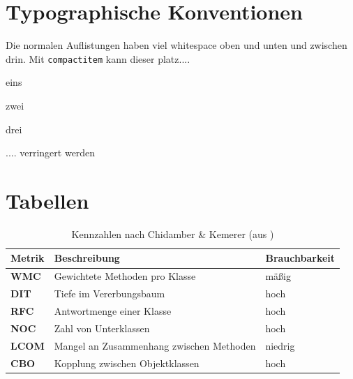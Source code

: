 \section{Typographische Konventionen}
Die normalen Auflistungen haben viel whitespace oben und unten und zwischen drin. Mit \texttt{compactitem} kann dieser platz....
\begin{compactitem}
\item eins
\item zwei
\item drei
\end{compactitem}
.... verringert werden

\section{Tabellen}
\blindtext
\begin{table}[h]
	\centering
	\begin{tabular}{|l|l|l|}
\hline 
		Metrik 		  &Beschreibung 								&  Brauchbarkeit\\ 
\hline  
		\textbf{WMC}  &Gewichtete Methoden pro Klasse 				&  mäßig 		\\ 
\hline  
		\textbf{DIT}  &Tiefe im Vererbungsbaum 						&  hoch 		\\ 
\hline  
		\textbf{RFC}  &Antwortmenge einer Klasse 					&  hoch 		\\ 
\hline 
		\textbf{NOC}  &Zahl von Unterklassen 						&  hoch 		\\ 
\hline  
		\textbf{LCOM} &Mangel an Zusammenhang zwischen Methoden 	&  niedrig  	\\ 
\hline  
		\textbf{CBO}  &Kopplung zwischen Objektklassen 				&  hoch  		\\ 
\hline 
	\end{tabular} 
	\caption{Kennzahlen nach Chidamber \& Kemerer (aus \cite{Prech1999})}
	\label{tab:metrik}
\end{table}
